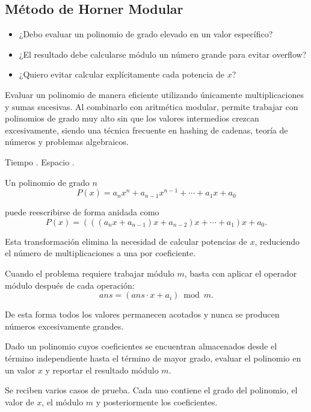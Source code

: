 \subsection{Método de Horner Modular}


\begin{itemize}
\item ¿Debo evaluar un polinomio de grado elevado en un valor específico?
\item ¿El resultado debe calcularse módulo un número grande para evitar overflow?
\item ¿Quiero evitar calcular explícitamente cada potencia de \(x\)?
\end{itemize}


Evaluar un polinomio de manera eficiente utilizando únicamente multiplicaciones y sumas sucesivas. Al combinarlo con aritmética modular, permite trabajar con polinomios de grado muy alto sin que los valores intermedios crezcan excesivamente, siendo una técnica frecuente en hashing de cadenas, teoría de números y problemas algebraicos.


Tiempo . Espacio .


Un polinomio de grado \(n\)
\[
P(x)=a_nx^n+a_{n-1}x^{n-1}+\cdots+a_1x+a_0
\]

puede reescribirse de forma anidada como
\[
P(x)=(((a_nx+a_{n-1})x+a_{n-2})x+\cdots+a_1)x+a_0.
\]

Esta transformación elimina la necesidad de calcular potencias de \(x\), reduciendo el número de multiplicaciones a una por coeficiente.

Cuando el problema requiere trabajar módulo \(m\), basta con aplicar el operador módulo después de cada operación:
\[
ans=(ans\cdot x+a_i)\bmod m.
\]

De esta forma todos los valores permanecen acotados y nunca se producen números excesivamente grandes.


Dado un polinomio cuyos coeficientes se encuentran almacenados desde el término independiente hasta el término de mayor grado, evaluar el polinomio en un valor \(x\) y reportar el resultado módulo \(m\).


Se reciben varios casos de prueba. Cada uno contiene el grado del polinomio, el valor de \(x\), el módulo \(m\) y posteriormente los coeficientes.

